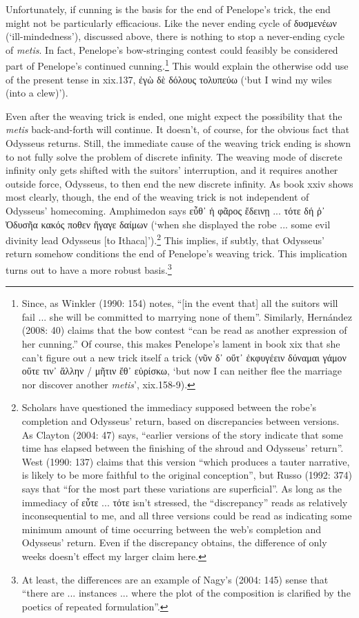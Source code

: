 \documentclass[12pt]{article}
\begin{document}
Unfortunately, if cunning is the basis for the end of Penelope's trick, the end might not be particularly efficacious. Like the never ending cycle of δυσμενέων (`ill-mindedness'), discussed above, there is nothing to stop a never-ending cycle of \textit{metis}. In fact, Penelope's bow-stringing contest could feasibly be considered part of Penelope's continued cunning.\footnote{ Since, as Winkler (1990: 154) notes, ``[in the event that] all the suitors will fail ... she will be committed to marrying none of them''. Similarly, Hern\'{a}ndez (2008: 40) claims that the bow contest ``can be read as another expression of her cunning.'' Of course, this makes Penelope's lament in book xix that she can't figure out a new trick itself a trick (νῦν δ᾿ οὔτ᾿ ἐκφυγέειν δύναμαι γάμον οὔτε τιν᾿ ἄλλην / μῆτιν ἔθ᾿ εὑρίσκω, `but now I can neither flee the marriage nor discover another \textit{metis}', xix.158-9).} This would explain the otherwise odd use of the present tense in xix.137, ἐγὼ δὲ δόλους τολυπεύω (`but I wind my wiles (into a clew)'). 

Even after the weaving trick is ended, one might expect the possibility that the \textit{metis} back-and-forth will continue. It doesn't, of course, for the obvious fact that Odysseus returns. Still, the immediate cause of the weaving trick ending is shown to not fully solve the problem of discrete infinity. The weaving mode of discrete infinity only gets shifted with the suitors' interruption, and it requires another outside force, Odysseus, to then end the new discrete infinity. As book xxiv shows most clearly, though, the end of the weaving trick is not independent of Odysseus' homecoming. Amphimedon says εὖθ᾿ ἡ φᾶρος ἔδεινῃ ... τότε δή ῥ᾿ Ὀδυσῆα κακός ποθεν ἤγαγε δαίμων (`when she displayed the robe ... some evil divinity lead Odysseus [to Ithaca]').\footnote{ Scholars have questioned the immediacy supposed between the robe's completion and Odysseus' return, based on discrepancies between versions. As Clayton (2004: 47) says, ``earlier versions of the story indicate that some time has elapsed between the finishing of the shroud and Odysseus' return''. West (1990: 137) claims that this version ``which produces a tauter narrative, is likely to be more faithful to the original conception'', but Russo (1992: 374) says that ``for the most part these variations are superficial''. As long as the immediacy of εὖτε ... τότε isn't stressed, the ``discrepancy'' reads as relatively inconsequential to me, and all three versions could be read as indicating some minimum amount of time occurring between the web's completion and Odysseus' return. Even if the discrepancy obtains, the difference of only weeks doesn't effect my larger claim here.} This implies, if subtly, that Odysseus' return somehow conditions the end of Penelope's weaving trick. This implication turns out to have a more robust basis.\footnote{At least, the differences are an example of Nagy's (2004: 145) sense that ``there are ... instances ... where the plot of the composition is clarified by the poetics of repeated formulation''.}
\end{document}
